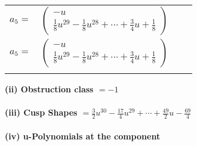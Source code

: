 \documentclass[1p]{elsarticle_modified}
\theoremstyle{definition}
\begin{document}
\begin{tabular}{m{7pt} m{180pt} m{7pt} m{180pt} }
\flushright $a_{5}=$&$\begin{pmatrix}- u\\\frac{1}{8} u^{29}-\frac{1}{8} u^{28}+\cdots+\frac{3}{4} u+\frac{1}{8}\end{pmatrix}$\\ \flushright $a_{5}=$&$\begin{pmatrix}- u\\\frac{1}{8} u^{29}-\frac{1}{8} u^{28}+\cdots+\frac{3}{4} u+\frac{1}{8}\end{pmatrix}$\\&\end{tabular}
\flushleft \textbf{(ii) Obstruction class $= -1$}\\~\\
\flushleft \textbf{(iii) Cusp Shapes $= \frac{3}{2} u^{30}-\frac{17}{4} u^{29}+\cdots+\frac{49}{2} u-\frac{69}{4}$}\\~\\
\newpage\renewcommand{\arraystretch}{1}
\flushleft \textbf{(iv) u-Polynomials at the component}\newline \\
\end{document}
